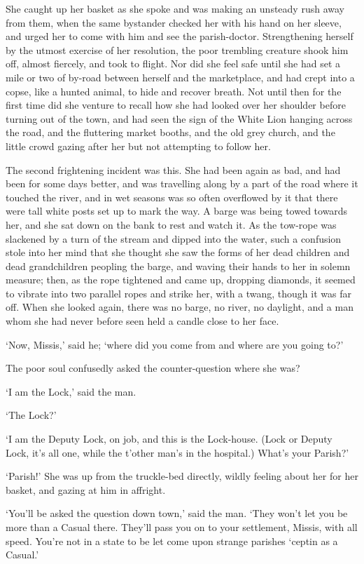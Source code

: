 She caught up her basket as she spoke and was making an unsteady rush
away from them, when the same bystander checked her with his hand on
her sleeve, and urged her to come with him and see the parish-doctor.
Strengthening herself by the utmost exercise of her resolution, the poor
trembling creature shook him off, almost fiercely, and took to flight.
Nor did she feel safe until she had set a mile or two of by-road between
herself and the marketplace, and had crept into a copse, like a hunted
animal, to hide and recover breath. Not until then for the first time
did she venture to recall how she had looked over her shoulder before
turning out of the town, and had seen the sign of the White Lion hanging
across the road, and the fluttering market booths, and the old grey
church, and the little crowd gazing after her but not attempting to
follow her.

The second frightening incident was this. She had been again as bad, and
had been for some days better, and was travelling along by a part of
the road where it touched the river, and in wet seasons was so often
overflowed by it that there were tall white posts set up to mark the
way. A barge was being towed towards her, and she sat down on the bank
to rest and watch it. As the tow-rope was slackened by a turn of the
stream and dipped into the water, such a confusion stole into her
mind that she thought she saw the forms of her dead children and dead
grandchildren peopling the barge, and waving their hands to her in
solemn measure; then, as the rope tightened and came up, dropping
diamonds, it seemed to vibrate into two parallel ropes and strike her,
with a twang, though it was far off. When she looked again, there was no
barge, no river, no daylight, and a man whom she had never before seen
held a candle close to her face.

‘Now, Missis,’ said he; ‘where did you come from and where are you going
to?’

The poor soul confusedly asked the counter-question where she was?

‘I am the Lock,’ said the man.

‘The Lock?’

‘I am the Deputy Lock, on job, and this is the Lock-house. (Lock or
Deputy Lock, it’s all one, while the t’other man’s in the hospital.)
What’s your Parish?’

‘Parish!’ She was up from the truckle-bed directly, wildly feeling about
her for her basket, and gazing at him in affright.

‘You’ll be asked the question down town,’ said the man. ‘They won’t let
you be more than a Casual there. They’ll pass you on to your settlement,
Missis, with all speed. You’re not in a state to be let come upon
strange parishes ‘ceptin as a Casual.’


